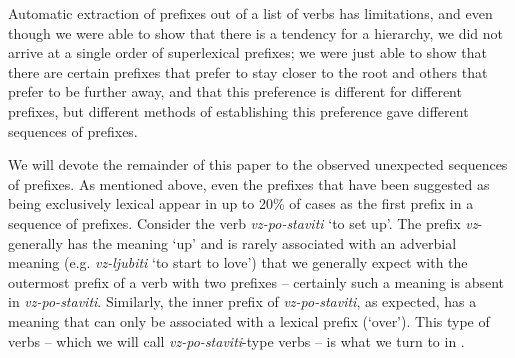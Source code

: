 \documentclass[output=paper,colorlinks,citecolor=brown]{langscibook}
\begin{document}
Automatic extraction of prefixes out of a list of verbs has limitations, and even though we were able to show that there is a tendency for a hierarchy, we did not arrive at a single order of superlexical prefixes; we were just able to show that there are certain prefixes that prefer to stay closer to the root and others that prefer to be further away, and that this preference is different for different prefixes, but different methods of establishing this preference gave different sequences of prefixes.

We will devote the remainder of this paper to the observed unexpected sequences of prefixes. As mentioned above, even the prefixes that have been suggested as being exclusively lexical appear in up to 20\% of cases as the first prefix in a sequence of prefixes. Consider the verb \textit{vz-po-staviti} `to set up'. The prefix \textit{vz}- generally has the meaning `up' and is rarely associated with an adverbial meaning (e.g. \textit{vz-ljubiti} `to start to love') that we generally expect with the outermost prefix of a verb with two prefixes -- certainly such a meaning is absent in \textit{vz-po-staviti}. Similarly, the inner prefix of \textit{vz-po-staviti}, as expected, has a meaning that can only be associated with a lexical prefix (`over'). This type of verbs -- which we will call \textit{vz-po-staviti}-type verbs -- is what we turn to in .  
     
\end{document}
